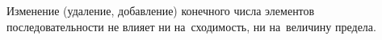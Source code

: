 
        Изменение (удаление, добавление) конечного числа элементов последовательности не влияет ни на~сходимость, ни на~величину предела.
    